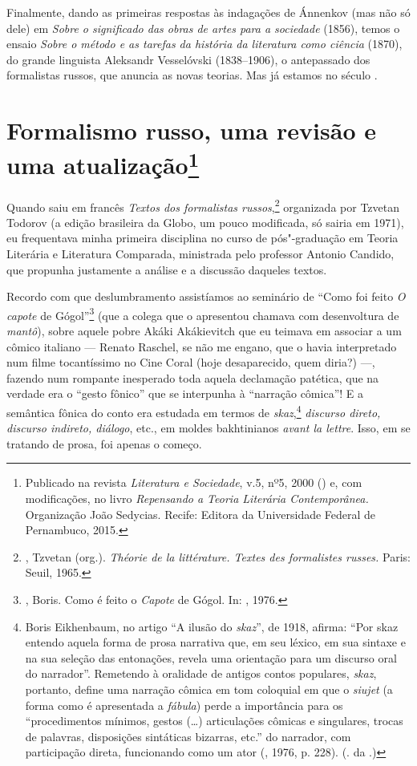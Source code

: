 Finalmente, dando as primeiras respostas às indagações de Ánnenkov (mas
não só dele) em \emph{Sobre o significado das obras de artes para a sociedade}
(1856), temos o ensaio \emph{Sobre o método e as tarefas da história da
literatura como ciência} (1870), do grande linguista Aleksandr
Vesselóvski (1838--1906), o antepassado dos formalistas russos, que anuncia as novas
teorias. Mas já estamos no século .

\chapter{Formalismo russo, uma revisão e uma atualização\footnote{Publicado na revista \emph{Literatura e Sociedade}, v.5, nº5, 2000 (\protect{}) e, com modificações, no livro \emph{Repensando a Teoria Literária Contemporânea.} Organização João Sedycias. Recife: Editora da Universidade Federal de Pernambuco, 2015.}}
\label{formalismo}

Quando saiu em francês \emph{Textos dos formalistas
russos},\footnote{, Tzvetan (org.). \emph{Théorie de la littérature. Textes des 
formalistes russes.} Paris: Seuil, 1965.} organizada por Tzvetan Todorov
(a edição brasileira da Globo, um pouco modificada, só sairia em 1971),
eu frequentava minha primeira disciplina no curso de pós"-graduação em Teoria Literária
e Literatura Comparada, ministrada pelo professor Antonio Candido, que propunha
justamente a análise e a discussão daqueles textos.


 Recordo com que deslumbramento assistíamos ao seminário de
``Como foi feito \emph{O capote} de Gógol''\footnote{, Boris.
 Como é feito o \emph{Capote} de Gógol. In: , 1976.} (que a colega que o
apresentou chamava com desenvoltura de \emph{mantô}), sobre aquele pobre Akáki
Akákievitch que eu teimava em associar a um cômico italiano --- Renato
Raschel, se não me engano, que o havia interpretado num filme
tocantíssimo no Cine Coral (hoje desaparecido, quem diria?) ---, fazendo num rompante inesperado toda aquela declamação patética, que na
verdade era o ``gesto fônico'' que se interpunha à ``narração cômica''!
E a semântica fônica do conto era estudada em termos de \emph{skaz},\footnote{Boris Eikhenbaum, no artigo ``A ilusão do \emph{skaz}'', de 1918, afirma: ``Por skaz entendo aquela forma de prosa narrativa
 que, em seu léxico, em sua sintaxe e na sua seleção das entonações,
 revela uma orientação para um discurso oral do narrador''. Remetendo
 à oralidade de antigos contos populares, \emph{skaz}, portanto, 
define uma narração cômica em tom coloquial em que o \emph{siujet}
 (a forma como é apresentada a \emph{fábula})
 perde a importância para os ``procedimentos mínimos, gestos
 (\ldots{}) articulações cômicas e singulares, trocas de palavras,
 disposições sintáticas bizarras, etc.'' do narrador, com participação 
direta, funcionando como um ator (, 1976, p. 228).
 (. da .)}
\emph{discurso direto, discurso indireto, diálogo}, etc., em moldes bakhtinianos
\emph{avant la lettre}. Isso, em se tratando de prosa, foi apenas o começo.


